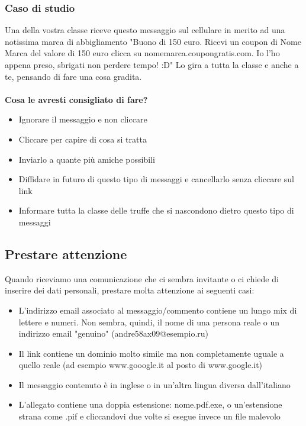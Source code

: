 \documentclass{article}
\begin{document}
\subsubsection{Caso di studio}
\label{sec:Caso7}
Una della vostra classe riceve questo messaggio sul cellulare in merito ad una notissima marca di abbigliamento "Buono di 150 euro. Ricevi un coupon di Nome Marca del valore di 150 euro clicca su nomemarca.coupongratis.com. Io l'ho appena preso, sbrigati non perdere tempo! :D" Lo gira a tutta la classe e anche a te, pensando di fare una cosa gradita.
\\\vspace{5mm}\\
\textbf{Cosa le avresti consigliato di fare?}
\begin{itemize}
	\item Ignorare il messaggio e non cliccare		
	\item Cliccare per capire di cosa si tratta		
	\item Inviarlo a quante più amiche possibili		
	\item Diffidare in futuro di questo tipo di messaggi e cancellarlo senza cliccare sul link		
	\item Informare tutta la classe delle truffe che si nascondono dietro questo tipo di messaggi
\end{itemize}
\subsection{Prestare attenzione}
Quando riceviamo una comunicazione che ci sembra invitante o ci chiede di inserire dei dati personali, prestare molta attenzione ai seguenti casi:
\begin{itemize}
	\item L'indirizzo email associato al messaggio/commento contiene un lungo mix di lettere e numeri. Non sembra, quindi, il nome di una persona reale o un indirizzo email "genuino" (andre58ax09@esempio.ru)
	\item Il link contiene un dominio molto simile ma non completamente uguale a quello reale (ad esempio www.gooogle.it al posto di www.google.it)
	\item Il messaggio contenuto è in inglese o in un'altra lingua diversa dall’italiano
	\item L'allegato contiene una doppia estensione: nome.pdf.exe, o un'estensione strana come .pif e cliccandovi due volte si esegue invece un file malevolo
\end{itemize}
\end{document}
